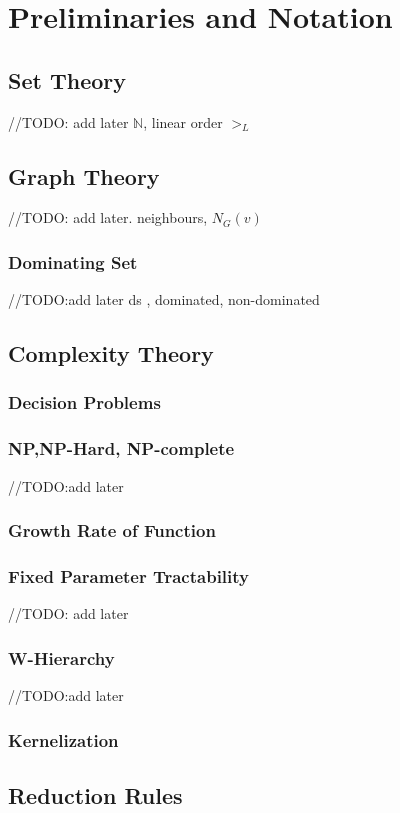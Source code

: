 \chapter{Preliminaries and Notation} \label{chap:prelim}
\section{Set Theory} \label{sec:set}
//TODO: add later $\mathds{N}$, linear order $>_L$ 
\section{Graph Theory}  \label{sec:graph}
//TODO: add later. neighbours, $N_G$$(v)$
\subsection{Dominating Set}
//TODO:add later ds , dominated, non-dominated
\section{Complexity Theory} \label{sec:complex}
\subsection{Decision Problems} \label{subsec:decision}
\subsection{NP,NP-Hard, NP-complete}
//TODO:add later
\subsection{Growth Rate of Function} \label{subsec:growth}
\subsection{Fixed Parameter Tractability} \label{subsec:fpt}
//TODO: add later
\subsection{W-Hierarchy} \label{subsec:whierarchy}
//TODO:add later
\subsection{Kernelization} \label{subsec:kern}
\section{Reduction Rules} \label{sec:reduce}
